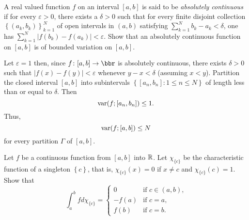 \begin{problem}
  A real valued function \(f\) on an interval \([a,b]\) is said to be
  \emph{absolutely continuous} if for every \(\varepsilon>0\), there exists
  a \(\delta>0\) such that for every finite disjoint collection
  \(\left\{(a_k,b_k)\right\}_{k=1}^N\) of open intervals in \((a,b)\)
  satisfying \(\sum_{k=1}^Nb_k-a_k<\delta\), one has
  \(\sum_{k=1}^N\left|f(b_k)-f(a_k)\right|<\varepsilon\). Show that an
  absolutely continuous function on \([a,b]\) is of bounded variation on
  \([a,b]\).
\end{problem}
\begin{solution}

  Let \(\varepsilon=1\) then, since \(f\colon[a,b]\to\bbr\) is absolutely
  continuous, there exists \(\delta>0\) such that
  \(|f(x)-f(y)|<\varepsilon\) whenever \(y-x<\delta\) (assuming
  \(x<y\)). Partition the closed interval \([a,b]\) into subintervals
  \(\left\{[a_n,b_n]:1\leq n\leq N\right\}\) of length less than or equal
  to \(\delta\). Then
  \[
    \operatorname{var}(f;[a_n,b_n])\leq 1.
  \]
  Thus,
  \[
    \operatorname{var}(f;[a,b])\leq N
  \]
  for every partition \(\Gamma\) of \([a,b]\).
\end{solution}

\begin{problem}
  Let \(f\) be a continuous function from \([a,b]\) into \(\mathbb{R}\). Let
  \(\chi_{\{c\}}\) be the characteristic function of a singleton
  \(\left\{c\right\}\), that is, \(\chi_{\{c\}}(x)=0\) if \(x\neq c\) and
  \(\chi_{\{c\}}(c)=1\). Show that
  \[
    \int_a^b f d \chi_{\{c\}}=
    \begin{cases}
      0&\text{if \(c\in(a,b)\),}\\
      -f(a)&\text{if \(c=a\),}\\
      f(b)&\text{if \(c=b\).}
    \end{cases}
  \]
\end{problem}
\begin{solution}
\end{solution}

